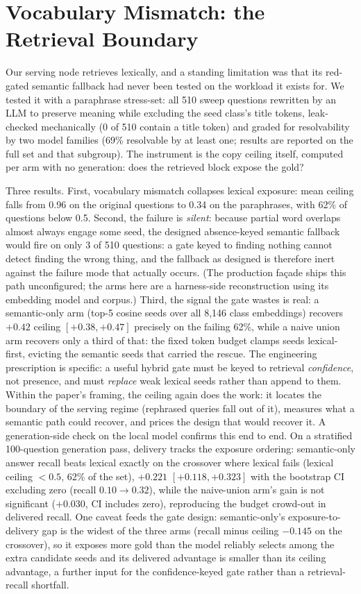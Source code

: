 \documentclass[10pt,twocolumn]{article}
\begin{document}
\section{Vocabulary Mismatch: the Retrieval Boundary}\label{sec:paraphrase}
Our serving node retrieves lexically, and a standing limitation was that its red-gated semantic
fallback had never been tested on the workload it exists for. We tested it with a paraphrase
stress-set: all 510 sweep questions rewritten by an LLM to preserve meaning while excluding the
seed class's title tokens, leak-checked mechanically (0 of 510 contain a title token) and graded
for resolvability by two model families (69\% resolvable by at least one; results are reported
on the full set and that subgroup). The instrument is the copy ceiling itself, computed per arm
with no generation: does the retrieved block expose the gold?

Three results. First, vocabulary mismatch collapses lexical exposure: mean ceiling falls from
0.96 on the original questions to 0.34 on the paraphrases, with 62\% of questions below 0.5.
Second, the failure is \emph{silent}: because partial word overlaps almost always engage some
seed, the designed absence-keyed semantic fallback would fire on only 3 of 510 questions:
a gate keyed to finding nothing cannot detect finding the wrong thing, and the fallback as
designed is therefore inert against the failure mode that actually occurs. (The production
fa\c{c}ade ships this path unconfigured; the arms here are a harness-side reconstruction using
its embedding model and corpus.) Third, the signal the gate wastes is real: a semantic-only arm
(top-5 cosine seeds over all 8{,}146 class embeddings) recovers $+0.42$ ceiling
$[+0.38,+0.47]$ precisely on the failing 62\%, while a naive union arm recovers only a third of
that: the fixed token budget clamps seeds lexical-first, evicting the semantic seeds that
carried the rescue. The engineering prescription is specific: a useful hybrid gate must be keyed
to retrieval \emph{confidence}, not presence, and must \emph{replace} weak lexical seeds rather
than append to them. Within the paper's framing, the ceiling again does the work: it locates
the boundary of the serving regime (rephrased queries fall out of it), measures what a semantic
path could recover, and prices the design that would recover it. A generation-side check on the local
model confirms this end to end. On a stratified 100-question generation pass, delivery tracks the
exposure ordering: semantic-only answer recall beats lexical exactly on the crossover where lexical
fails (lexical ceiling $<0.5$, 62\% of the set), $+0.221$ $[+0.118,+0.323]$ with the bootstrap CI
excluding zero (recall $0.10\to0.32$), while the naive-union arm's gain is not significant
($+0.030$, CI includes zero), reproducing the budget crowd-out in delivered recall. One caveat
feeds the gate design: semantic-only's exposure-to-delivery gap is the widest of the three arms
(recall minus ceiling $-0.145$ on the crossover), so it exposes more gold than the model reliably
selects among the extra candidate seeds and its delivered advantage is smaller than its ceiling
advantage, a further input for the confidence-keyed gate rather than a retrieval-recall shortfall.
\end{document}

